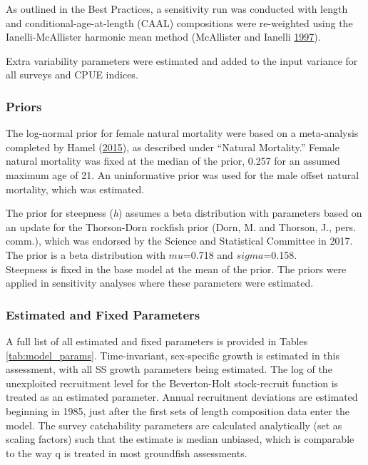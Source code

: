 \documentclass[12pt,]{article}
\begin{document}
As outlined in the Best Practices, a sensitivity run was conducted with
length and conditional-age-at-length (CAAL) compositions were
re-weighted using the Ianelli-McAllister harmonic mean method
(McAllister and Ianelli \protect\hyperlink{ref-McAllister1997}{1997}).

Extra variability parameters were estimated and added to the input
variance for all surveys and CPUE indices.

\subsubsection{Priors}\label{priors}

The log-normal prior for female natural mortality were based on a
meta-analysis completed by Hamel
(\protect\hyperlink{ref-Hamel2015}{2015}), as described under ``Natural
Mortality.'' Female natural mortality was fixed at the median of the
prior, 0.257 for an assumed maximum age of 21. An uninformative prior
was used for the male offset natural mortality, which was estimated.

The prior for steepness (\emph{h}) assumes a beta distribution with
parameters based on an update for the Thorson-Dorn rockfish prior (Dorn,
M. and Thorson, J., pers. comm.), which was endorsed by the Science and
Statistical Committee in 2017. The prior is a beta distribution with
\(mu\)=0.718 and \(sigma\)=0.158.\\
Steepness is fixed in the base model at the mean of the prior. The
priors were applied in sensitivity analyses where these parameters were
estimated.

\subsubsection{Estimated and Fixed
Parameters}\label{estimated-and-fixed-parameters}

A full list of all estimated and fixed parameters is provided in Tables
\ref{tab:model_params}. Time-invariant, sex-specific growth is estimated
in this assessment, with all SS growth parameters being estimated. The
log of the unexploited recruitment level for the Beverton-Holt
stock-recruit function is treated as an estimated parameter. Annual
recruitment deviations are estimated beginning in 1985, just after the
first sets of length composition data enter the model. The survey
catchability parameters are calculated analytically (set as scaling
factors) such that the estimate is median unbiased, which is comparable
to the way q is treated in most groundfish assessments.
\end{document}
